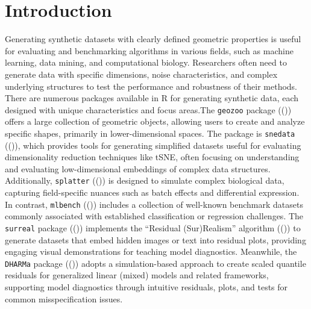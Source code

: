 \documentclass[
  11pt,
  a4paper,
]{report}
\begin{document}
\section{Introduction}\label{introduction-2}

Generating synthetic datasets with clearly defined geometric properties
is useful for evaluating and benchmarking algorithms in various fields,
such as machine learning, data mining, and computational biology.
Researchers often need to generate data with specific dimensions, noise
characteristics, and complex underlying structures to test the
performance and robustness of their methods. There are numerous packages
available in R for generating synthetic data, each designed with unique
characteristics and focus areas.The \texttt{geozoo} package
(()) offers a large
collection of geometric objects, allowing users to create and analyze
specific shapes, primarily in lower-dimensional spaces. The package is
\texttt{snedata} (()),
which provides tools for generating simplified datasets useful for
evaluating dimensionality reduction techniques like tSNE, often focusing
on understanding and evaluating low-dimensional embeddings of complex
data structures. Additionally, \texttt{splatter}
(()) is designed to simulate
complex biological data, capturing field-specific nuances such as batch
effects and differential expression. In contrast, \texttt{mlbench}
(()) includes a
collection of well-known benchmark datasets commonly associated with
established classification or regression challenges. The
\texttt{surreal} package
(()) implements the
``Residual (Sur)Realism'' algorithm
(()) to generate
datasets that embed hidden images or text into residual plots, providing
engaging visual demonstrations for teaching model diagnostics.
Meanwhile, the \texttt{DHARMa} package
(()) adopts a
simulation-based approach to create scaled quantile residuals for
generalized linear (mixed) models and related frameworks, supporting
model diagnostics through intuitive residuals, plots, and tests for
common misspecification issues.
\end{document}
